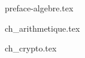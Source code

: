 \documentclass[11pt,twoside,openright]{report}
\begin{document}
{preface-algebre.tex}
\debutchapitres



{ch_arithmetique.tex}

{ch_crypto.tex}
%
%
%


\end{document}
